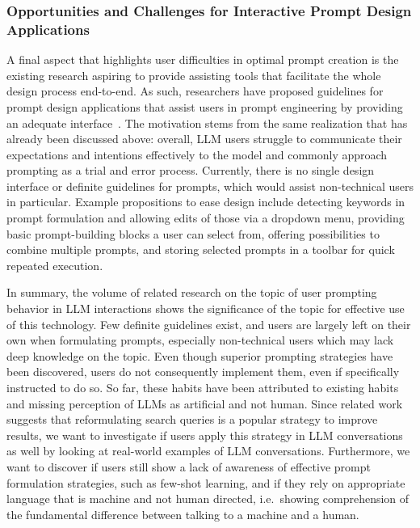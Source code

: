 \subsubsection{Opportunities and Challenges for Interactive Prompt Design Applications}
A final aspect that highlights user difficulties in optimal prompt creation is the existing
research aspiring to provide assisting tools that facilitate the whole design process end-to-end.
As such, researchers have proposed guidelines for prompt design applications that assist
users in prompt engineering by providing an adequate interface~\cite{dang_how_2022}.
The motivation stems from the same realization that has already been discussed above: overall,
LLM users struggle to communicate their expectations and intentions effectively to the model and
commonly approach prompting as a trial and error process.
Currently, there is no single design interface or definite guidelines for prompts, which would
assist non-technical users in particular.
Example propositions to ease design include detecting keywords in prompt formulation and allowing
edits of those via a dropdown menu, providing basic prompt-building blocks a user can select from,
offering possibilities to combine multiple prompts, and storing selected prompts in a toolbar for
quick repeated execution.


In summary, the volume of related research on the topic of user prompting behavior in LLM
interactions shows the significance of the topic for effective use of this technology.
Few definite guidelines exist, and users are largely left on their own when formulating prompts,
especially non-technical users which may lack deep knowledge on the topic.
Even though superior prompting strategies have been discovered, users do not consequently
implement them, even if specifically instructed to do so.
So far, these habits have been attributed to existing habits and missing perception of LLMs as
artificial and not human.
Since related work suggests that reformulating search queries is a popular strategy to improve
results, we want to investigate if users apply this strategy in LLM conversations as well by
looking at real-world examples of LLM conversations.
Furthermore, we want to discover if users still show a lack of awareness of effective prompt
formulation strategies, such as few-shot learning, and if they rely on appropriate language that
is machine and not human directed, i.e.\ showing comprehension of the fundamental difference
between talking to a machine and a human.



